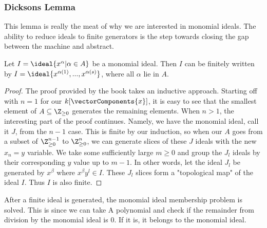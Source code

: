 \subsubsection{Dicksons Lemma}
This lemma is really the meat of why we are interested in monomial ideals. The ability to reduce ideals to finite generators is the step towards closing the gap between the machine and abstract. 

\begin{theorem}
Let $I = \ideal{x^\alpha | \alpha \in A}$ be a monomial ideal. Then $I$ can be finitely written by $I = \ideal{x^{\alpha(1)}, ... , x^{\alpha(s)}}$, where all $\alpha$ lie in $A$.  
\end{theorem}

\begin{proof}
   The proof provided by the book \cite{Theory} takes an inductive approach. Starting off with $n=1$ for our $k[\vectorComponents{x}]$, it is easy to see that the smallest element of $A \subseteq \Z_{\ge 0}$ generates the remaining elements. When $n > 1$, the interesting part of the proof continues. Namely, we have the monomial ideal, call it $J$, from the $n-1$ case. This is finite by our induction, so when our $A$ goes from a subset of $\Z_{\ge 0}^{n-1}$ to $\Z_{\ge 0}^{n}$, we can generate slices of these $J$ ideals with the new $x_n = y$ variable. We take some sufficiently large $m \ge 0$ and group the $J_l$ ideals by their corresponding $y$ value up to $m-1$. In other words, let the ideal $J_l$ be generated by $x^\beta$ where $x^\beta y^l \in I$. These $J_l$ slices form a "topological map" of the ideal $I$. Thus $I$ is also finite.    
\end{proof}

After a finite ideal is generated, the monomial ideal membership problem is solved. This is since we can take A polynomial and check if the remainder from division by the monomial ideal is $0$. If it is, it belongs to the monomial ideal.
